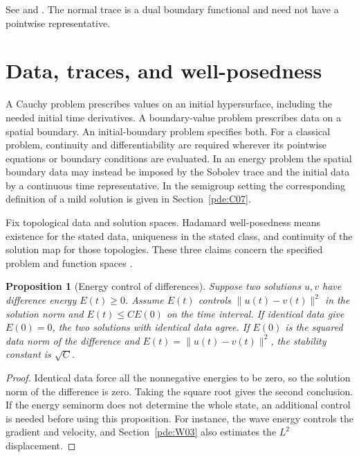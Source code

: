\documentclass[11pt,oneside,openany]{book}
\theoremstyle{plain}
\newtheorem{proposition}[theorem]{Proposition}
\theoremstyle{definition}
\theoremstyle{remark}
\begin{document}
See \cite[Sections 5.2 and 6.1]{Evans} and \cite[Chapter 5, Section 7]{TaylorI}.
The normal trace is a dual boundary functional and need not have
a pointwise representative.

\section{Data, traces, and well-posedness}
\label{pde:C03}

A Cauchy problem prescribes values on an initial hypersurface,
including the needed initial time derivatives. A boundary-value
problem prescribes data on a spatial boundary. An initial-boundary
problem specifies both. For a classical problem, continuity and
differentiability are required wherever its pointwise equations or
boundary conditions are evaluated. In an energy problem the spatial
boundary data may instead be imposed by the Sobolev trace and
the initial data by a continuous time representative. In the
semigroup setting the corresponding definition of a mild solution
is given in Section~\ref{pde:C07}.

Fix topological data and solution spaces. Hadamard well-posedness
means existence for the stated data, uniqueness in the stated class,
and continuity of the solution map for those topologies.
These three claims concern the specified problem and function spaces
\cite[Section 1.3]{Evans}\cite[Section 1.1.5]{RR}.

\begin{proposition}[Energy control of differences]
\label{prop:pde-energy-stability}
Suppose two solutions \(u,v\) have difference energy \(E(t)\ge0\).
Assume \(E(t)\) controls \(\|u(t)-v(t)\|^2\) in the solution norm
and \(E(t)\le C E(0)\) on the time interval. If identical data
give \(E(0)=0\), the two solutions with identical data agree.
If \(E(0)\) is the squared data norm of the difference and
\(E(t)=\|u(t)-v(t)\|^2\), the stability constant is \(\sqrt C\).
\end{proposition}
\begin{proof}
Identical data force all the nonnegative energies to be zero,
so the solution norm of the difference is zero. Taking the
square root gives the second conclusion. If the energy seminorm
does not determine the whole state, an additional control is
needed before using this proposition. For instance, the wave
energy controls the gradient and velocity, and Section~\ref{pde:W03}
also estimates the \(L^2\) displacement.
\end{proof}
\end{document}
